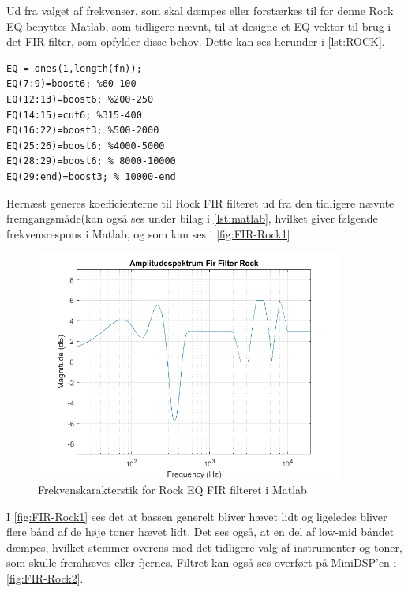 Ud fra valget af frekvenser, som skal dæmpes eller forstærkes til for denne Rock EQ benyttes Matlab, som tidligere nævnt, til at designe et EQ vektor til brug i det FIR filter, som opfylder disse behov. Dette kan ses herunder i  \autoref{lst:ROCK}.   

\begin{lstlisting}[frame=single, caption={FIR EQ vektor Rock kode},label={lst:ROCK},captionpos=b]
%% Rock
EQ = ones(1,length(fn));
EQ(7:9)=boost6; %60-100 
EQ(12:13)=boost6; %200-250 
EQ(14:15)=cut6; %315-400 
EQ(16:22)=boost3; %500-2000
EQ(25:26)=boost6; %4000-5000
EQ(28:29)=boost6; % 8000-10000
EQ(29:end)=boost3; % 10000-end
\end{lstlisting} 
Hernæst generes koefficienterne til Rock FIR filteret ud fra den tidligere nævnte fremgangsmåde(kan også ses under bilag i \autoref{lst:matlab}, hvilket giver følgende frekvensrespons i Matlab, og som kan ses i  \autoref{fig:FIR-Rock1}

\begin{figure}[H]
	\center
	\includegraphics[width=0.9\textwidth]{figur/FIR-Rock1}
	\caption{Frekvenskarakterstik for Rock EQ FIR filteret i Matlab}
	\label{fig:FIR-Rock1}
\end{figure}
I \autoref{fig:FIR-Rock1} ses det at bassen generelt bliver hævet lidt og ligeledes bliver flere bånd af de høje toner hævet lidt. Det ses også, at en del af low-mid båndet dæmpes, hvilket stemmer overens med det tidligere valg af instrumenter og toner, som skulle fremhæves eller fjernes. Filtret kan også ses overført på MiniDSP'en i \autoref{fig:FIR-Rock2}.

